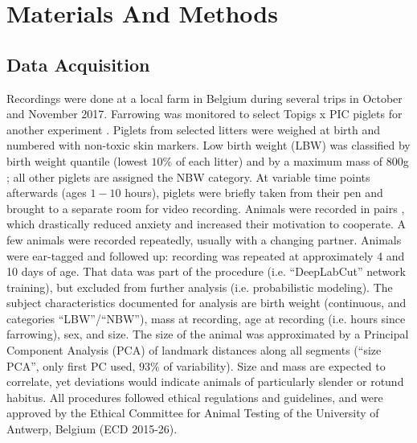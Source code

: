\FloatBarrier
\clearpage
\section{Materials And Methods}
\label{methods_22}

\subsection{Data Acquisition}
\label{sec:orgd0bae22}

Recordings were done at a local farm in Belgium during several trips in October and November 2017.
Farrowing was monitored to select Topigs x PIC piglets for another experiment \citep{Ayuso2021}.
Piglets from selected litters were weighed at birth and numbered with non-toxic skin markers.
Low birth weight (LBW) was classified by birth weight quantile (lowest \(10 \%\) of each litter) and by a maximum mass of \(800\)g \citep{Litten2003,VanTichelen2021,Wang2016,DInca2011}; all other piglets are assigned the NBW category.
At variable time points afterwards (ages \(1 - 10\) hours), piglets were briefly taken from their pen and brought to a separate room for video recording.
Animals were recorded in pairs \citep[as in][]{Mielke2018}, which drastically reduced anxiety and increased their motivation to cooperate.
A few animals were recorded repeatedly, usually with a changing partner.
Animals were ear-tagged and followed up: recording was repeated at approximately 4 and 10 days of age.
That data was part of the  procedure (i.e. ``DeepLabCut'' network training), but excluded from further analysis (i.e. probabilistic modeling).
The subject characteristics documented for analysis are birth weight (continuous, and categories ``LBW''/``NBW''), mass at recording, age at recording (i.e. hours since farrowing), sex, and size.
The size of the animal was approximated by a Principal Component Analysis (PCA) of landmark distances along all segments (``size PCA'', only first PC used,
\(93 \%\)
of variability).
Size and mass are expected to correlate, yet deviations would indicate animals of particularly slender or rotund habitus.
All procedures followed ethical regulations and guidelines, and were approved by the Ethical Committee for Animal Testing of the University of Antwerp, Belgium (ECD 2015-26).



